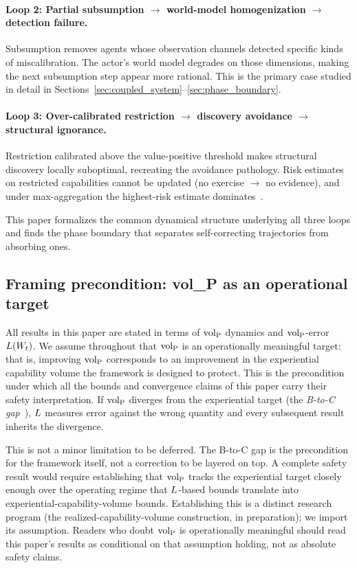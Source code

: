 \paragraph{Loop 2: Partial subsumption $\to$ world-model homogenization $\to$ detection failure.}
Subsumption removes agents whose observation channels detected
specific kinds of miscalibration.  The actor's world model degrades on
those dimensions, making the next subsumption step appear more rational.
This is the primary case studied in detail in
Sections~\ref{sec:coupled_system}--\ref{sec:phase_boundary}.

\paragraph{Loop 3: Over-calibrated restriction $\to$ discovery avoidance $\to$ structural ignorance.}
Restriction calibrated above the value-positive threshold makes
structural discovery locally suboptimal, recreating the avoidance
pathology.  Risk estimates on restricted capabilities cannot be
updated (no exercise $\to$ no evidence), and under max-aggregation the
highest-risk estimate dominates~\citep{lasser2026horizon}.

\medskip

This paper formalizes the common dynamical structure underlying all
three loops and finds the phase boundary that separates
self-correcting trajectories from absorbing ones.

\subsection{Framing precondition: vol\_P as an operational target}
\label{sec:framing_precondition}

All results in this paper are stated in terms of ${\operatorname{vol}_{\mathrm{P}}}$ dynamics and
${\operatorname{vol}_{\mathrm{P}}}$-error $L(W_t)$.  We assume throughout that ${\operatorname{vol}_{\mathrm{P}}}$ is an
operationally meaningful target: that is, improving ${\operatorname{vol}_{\mathrm{P}}}$ corresponds
to an improvement in the experiential capability volume the framework
is designed to protect.  This is the precondition under which all the
bounds and convergence claims of this paper carry their safety
interpretation.  If ${\operatorname{vol}_{\mathrm{P}}}$ diverges from the experiential target
(the \emph{B-to-C gap}~\citep{lasser2026gfm}), $L$ measures error
against the wrong quantity and every subsequent result inherits the
divergence.

This is not a minor limitation to be deferred.  The B-to-C gap is
the precondition for the framework itself, not a correction to be
layered on top.  A complete safety result would require establishing
that ${\operatorname{vol}_{\mathrm{P}}}$ tracks the experiential target closely enough over the
operating regime that $L$-based bounds translate into
experiential-capability-volume bounds.  Establishing this is a
distinct research program (the realized-capability-volume
construction, in preparation); we import its assumption.  Readers who
doubt ${\operatorname{vol}_{\mathrm{P}}}$ is operationally meaningful should read this paper's
results as conditional on that assumption holding, not as absolute
safety claims.

